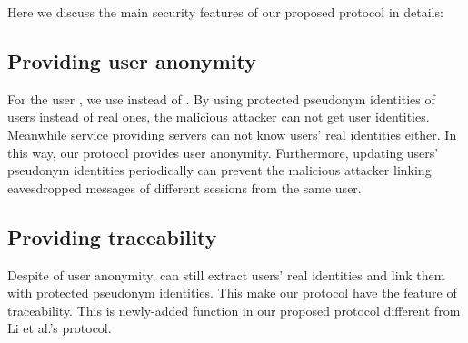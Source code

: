 \documentclass[preprint,12pt]{elsarticle}
\begin{document}
\begin{table}[h]
\centering
\caption{Security functionality comparison of our protocol and two other related protocols}
\end{table}

Here we discuss the main security features of our proposed protocol in details:

\subsection{Providing user anonymity}

For the user , we use  instead of . By using protected pseudonym identities of users instead of real ones, the malicious attacker can not get user identities. Meanwhile service providing servers can not know users' real identities either. In this way, our protocol provides user anonymity. Furthermore, updating users' pseudonym identities periodically can prevent the malicious attacker linking eavesdropped messages of different sessions from the same user.

\subsection{Providing traceability}
Despite of user anonymity,  can still extract users' real identities and link them with protected pseudonym identities. This make our protocol have the feature of traceability. This is newly-added function in our proposed protocol different from Li et al.'s protocol.
\end{document}
